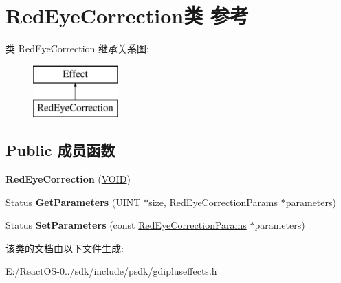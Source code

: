 \hypertarget{class_red_eye_correction}{}\section{Red\+Eye\+Correction类 参考}
\label{class_red_eye_correction}
类 Red\+Eye\+Correction 继承关系图\+:\begin{figure}[H]
\begin{center}
\leavevmode
\includegraphics[height=2.000000cm]{class_red_eye_correction}
\end{center}
\end{figure}
\subsection*{Public 成员函数}
\begin{DoxyCompactItemize}
\item 
\mbox{\label{class_red_eye_correction_a2ca6749bae766d05611f30a5c0ee8c1d}} 
{\bfseries Red\+Eye\+Correction} (\hyperlink{interfacevoid}{V\+O\+ID})
\item 
\mbox{\label{class_red_eye_correction_a629fc9e3f3945ffb178821ac9096ceae}} 
Status {\bfseries Get\+Parameters} (U\+I\+NT $\ast$size, \hyperlink{struct_red_eye_correction_params}{Red\+Eye\+Correction\+Params} $\ast$parameters)
\item 
\mbox{\label{class_red_eye_correction_a026aeabf068a637a37d4f5802dbbd16e}} 
Status {\bfseries Set\+Parameters} (const \hyperlink{struct_red_eye_correction_params}{Red\+Eye\+Correction\+Params} $\ast$parameters)
\end{DoxyCompactItemize}


该类的文档由以下文件生成\+:\begin{DoxyCompactItemize}
\item 
E\+:/\+React\+O\+S-\/0../sdk/include/psdk/gdipluseffects.\+h\end{DoxyCompactItemize}
